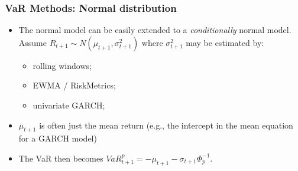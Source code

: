 \begin{frame}%

\frametitle{VaR Methods: Normal distribution}

\begin{itemize}


\item The normal model can be easily extended to a \emph{\color{red}%
conditionally} normal model. Assume $R_{t+1}\sim N(\mu_{t+1},\sigma
_{t+1}^{2}) $ where $\sigma _{t+1}^{2}$ may be estimated by:

\begin{itemize}
\item rolling windows;

\item EWMA / RiskMetrics;

\item univariate GARCH;

\end{itemize}
\item $\mu_{t+1}$ is often just the mean return (e.g., the intercept in the mean equation for a GARCH model)
\item The VaR then becomes $VaR_{t+1}^{p}=-\mu_{t+1}-\sigma _{t+1}\Phi _{p}^{-1}$.
\end{itemize}

\end{frame}%


